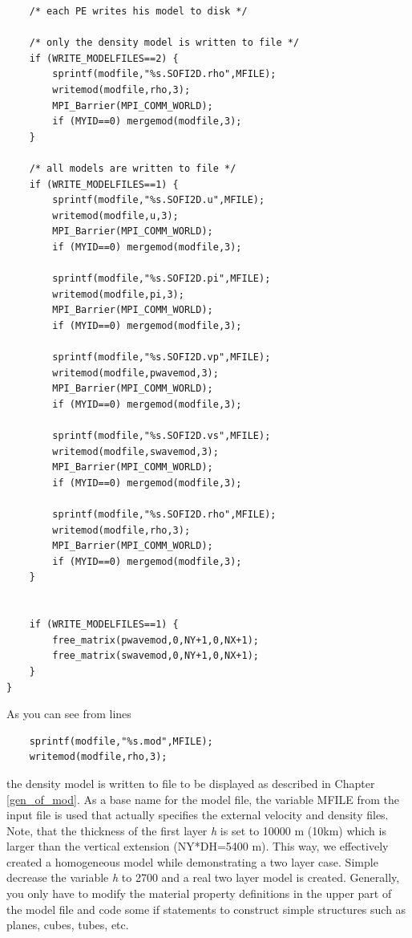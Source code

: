 \documentclass[11pt,onecolumn,oneside]{article}
\begin{document}
\begin{verbatim}
	/* each PE writes his model to disk */

	/* only the density model is written to file */
	if (WRITE_MODELFILES==2) {
		sprintf(modfile,"%s.SOFI2D.rho",MFILE);
		writemod(modfile,rho,3);
		MPI_Barrier(MPI_COMM_WORLD);
		if (MYID==0) mergemod(modfile,3);
	}

	/* all models are written to file */
	if (WRITE_MODELFILES==1) {
		sprintf(modfile,"%s.SOFI2D.u",MFILE);
		writemod(modfile,u,3);
		MPI_Barrier(MPI_COMM_WORLD);
		if (MYID==0) mergemod(modfile,3);

		sprintf(modfile,"%s.SOFI2D.pi",MFILE);
		writemod(modfile,pi,3);
		MPI_Barrier(MPI_COMM_WORLD);
		if (MYID==0) mergemod(modfile,3);

		sprintf(modfile,"%s.SOFI2D.vp",MFILE);
		writemod(modfile,pwavemod,3);
		MPI_Barrier(MPI_COMM_WORLD);
		if (MYID==0) mergemod(modfile,3);

		sprintf(modfile,"%s.SOFI2D.vs",MFILE);
		writemod(modfile,swavemod,3);
		MPI_Barrier(MPI_COMM_WORLD);
		if (MYID==0) mergemod(modfile,3);

		sprintf(modfile,"%s.SOFI2D.rho",MFILE);
		writemod(modfile,rho,3);
		MPI_Barrier(MPI_COMM_WORLD);
		if (MYID==0) mergemod(modfile,3);
	}


	if (WRITE_MODELFILES==1) {
		free_matrix(pwavemod,0,NY+1,0,NX+1);
		free_matrix(swavemod,0,NY+1,0,NX+1);
	}
}
\end{verbatim}

As you can see from lines

\begin{verbatim}
	sprintf(modfile,"%s.mod",MFILE);
	writemod(modfile,rho,3);
\end{verbatim}

the density model is written to file to be displayed as described in Chapter \ref{gen_of_mod}. As a base name for the model file, the variable MFILE from the input file is used that actually specifies the external velocity and density files. Note, that the thickness of the first layer \textit{h} is set to 10000 m (10km) which is larger than the vertical extension (NY*DH=5400 m). This way, we effectively created a homogeneous model while demonstrating a two layer case. Simple decrease the variable \textit{h} to 2700 and a real two layer model is created. Generally, you only have to modify the material property definitions in the upper part of the model file and code some if statements to construct simple structures such as planes, cubes, tubes, etc.
\end{document}
